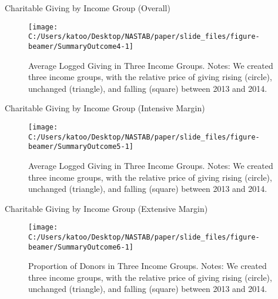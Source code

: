 \documentclass[
  ignorenonframetext,
  aspectratio=169,
]{beamer}
\begin{document}
\begin{frame}{Charitable Giving by Income Group (Overall)}
\protect\hypertarget{charitable-giving-by-income-group-overall}{}
\begin{figure}[t]

{\centering \texttt{[image: C:/Users/katoo/Desktop/NASTAB/paper/slide\_files/figure-beamer/SummaryOutcome4-1]} 

}

\caption{Average Logged Giving in Three Income Groups. Notes: We created three income groups, with the relative price of giving rising (circle), unchanged (triangle), and falling (square) between 2013 and 2014.}\label{fig:SummaryOutcome4}
\end{figure}
\end{frame}

\begin{frame}{Charitable Giving by Income Group (Intensive Margin)}
\protect\hypertarget{charitable-giving-by-income-group-intensive-margin}{}
\begin{figure}[t]

{\centering \texttt{[image: C:/Users/katoo/Desktop/NASTAB/paper/slide\_files/figure-beamer/SummaryOutcome5-1]} 

}

\caption{Average Logged Giving in Three Income Groups. Notes: We created three income groups, with the relative price of giving rising (circle), unchanged (triangle), and falling (square) between 2013 and 2014.}\label{fig:SummaryOutcome5}
\end{figure}
\end{frame}

\begin{frame}{Charitable Giving by Income Group (Extensive Margin)}
\protect\hypertarget{charitable-giving-by-income-group-extensive-margin}{}
\begin{figure}[t]

{\centering \texttt{[image: C:/Users/katoo/Desktop/NASTAB/paper/slide\_files/figure-beamer/SummaryOutcome6-1]} 

}

\caption{Proportion of Donors in Three Income Groups. Notes: We created three income groups, with the relative price of giving rising (circle), unchanged (triangle), and falling (square) between 2013 and 2014.}\label{fig:SummaryOutcome6}
\end{figure}
\end{frame}
\end{document}
